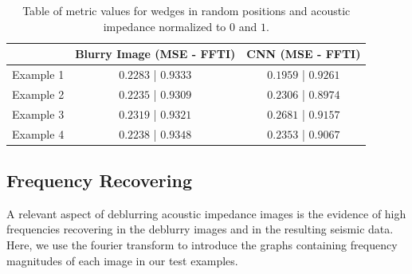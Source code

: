 \documentclass[conference]{IEEEtran}
\begin{document}
\begin{table}[!t]
\renewcommand{\arraystretch}{1.2}
\caption{Table of metric values for wedges in random positions and acoustic impedance normalized to $0$ and $1$.}
\label{table_caso_6}
\centering
\begin{tabular}{|c||c||c|}
\hline
  & Blurry Image (MSE - FFTI) & CNN (MSE - FFTI)\\
\hline
Example 1 & $0.2283$ | $0.9333$ & $0.1959$ | $0.9261$\\
\hline
Example 2 & $0.2235$ | $0.9309$ & $0.2306$ | $0.8974$\\
\hline
Example 3 & $0.2319$ | $0.9321$ & $0.2681$ | $0.9157$\\
\hline
Example 4 & $0.2238$ | $0.9348$ & $0.2353$ | $0.9067$\\
\hline
\end{tabular}
\end{table}

\subsection{Frequency Recovering}
A relevant aspect of deblurring acoustic impedance images is the
evidence of high frequencies recovering in the deblurry images and in
the resulting seismic data. Here, we use the fourier transform
to introduce the graphs containing frequency magnitudes of each image in our
test examples.
\end{document}
